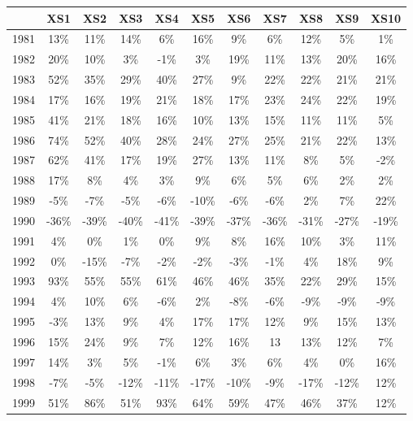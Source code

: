 \documentclass[11pt]{article}
\begin{document}
\begin{table}[H]
    \centering
    \small
    \begin{tabular}{ccccccccccc}
    \toprule\toprule
    & \textbf{XS1} & \textbf{XS2} & \textbf{XS3} & \textbf{XS4} & \textbf{XS5} & \textbf{XS6} & \textbf{XS7} & \textbf{XS8} & \textbf{XS9} & \textbf{XS10}\\ 
    \midrule
    1981 & 13\% & 11\% & 14\% & 6\% & 16\% & 9\% & 6\% & 12\% & 5\% & 1\% \\
    1982 & 20\% & 10\% & 3\% & -1\% & 3\% & 19\% & 11\% & 13\% & 20\% & 16\% \\
    1983 & 52\% & 35\% & 29\% & 40\% & 27\% & 9\% & 22\% & 22\% & 21\% & 21\% \\
    1984 & 17\% & 16\% & 19\% & 21\% & 18\% & 17\% & 23\% & 24\% & 22\% & 19\% \\ 
    1985 & 41\% & 21\% & 18\% & 16\% & 10\% & 13\% & 15\% & 11\% & 11\% & 5\% \\ 
    1986 & 74\% & 52\% & 40\% & 28\% & 24\% & 27\% & 25\% & 21\% & 22\% & 13\% \\
    1987 & 62\% & 41\% & 17\% & 19\% & 27\% & 13\% & 11\% & 8\% & 5\% & -2\% \\
    1988 & 17\% & 8\% & 4\% & 3\% & 9\% & 6\% & 5\% & 6\% & 2\% & 2\% \\
    1989 & -5\% & -7\% & -5\% & -6\% & -10\% & -6\% & -6\% & 2\% & 7\% & 22\% \\
    \rowcolor{myred} 1990 & -36\% & -39\% & -40\% & -41\% & -39\% & -37\% & -36\% & -31\% & -27\% & -19\% \\
    1991 & 4\% & 0\% & 1\% & 0\% & 9\% & 8\% & 16\% & 10\% & 3\% & 11\% \\
    1992 & 0\% & -15\% & -7\% & -2\% & -2\% & -3\% & -1\% & 4\% & 18\% & 9\% \\
    1993 & 93\% & 55\% & 55\% & 61\% & 46\% & 46\% & 35\% & 22\% & 29\% & 15\% \\
    1994 & 4\% & 10\% & 6\% & -6\% & 2\% & -8\% & -6\% & -9\% & -9\% & -9\% \\
    1995 & -3\% & 13\% & 9\% & 4\% & 17\% & 17\% & 12\% & 9\% & 15\% & 13\% \\
    1996 & 15\% & 24\% & 9\% & 7\% & 12\% & 16\% & 13 & 13\% & 12\% & 7\% \\
    1997 & 14\% & 3\% & 5\% & -1\% & 6\% & 3\% & 6\% & 4\% & 0\% & 16\% \\
    1998 & -7\% & -5\% & -12\% & -11\% & -17\% & -10\% & -9\% & -17\% & -12\% & 12\% \\
    \rowcolor{myblue} 1999 & 51\% & 86\% & 51\% & 93\% & 64\% & 59\% & 47\% & 46\% & 37\% & 12\% \\

\end{tabular}
\end{table}
\end{document}
